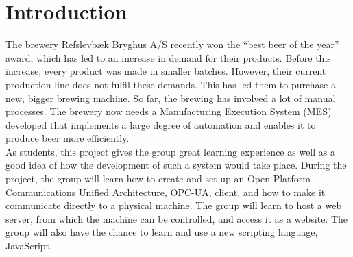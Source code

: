 \section{Introduction}
The brewery Refslevbæk Bryghus A/S recently won the “best beer of the year” 
award, which has led to an increase in demand for their products. Before this
increase, every product was made in smaller batches. However, their current
production line does not fulfil these demands. This has led them to purchase a
new, bigger brewing machine. So far, the brewing has involved a lot of manual
processes. The brewery now needs a Manufacturing Execution System (MES)
developed that implements a large degree of automation and enables it to produce
beer more efficiently.\\

As students, this project gives the group great learning experience as
well as a good idea of how the development of such a system would take place. 
During the project, the group will learn how to create and set up an Open
Platform Communications Unified Architecture, OPC-UA, client, and how to make it
communicate directly to a physical machine. The group will learn to host a web
server, from which the machine can be controlled, and access it as a website.
The group will also have the chance to learn and use a new scripting language,
JavaScript.

